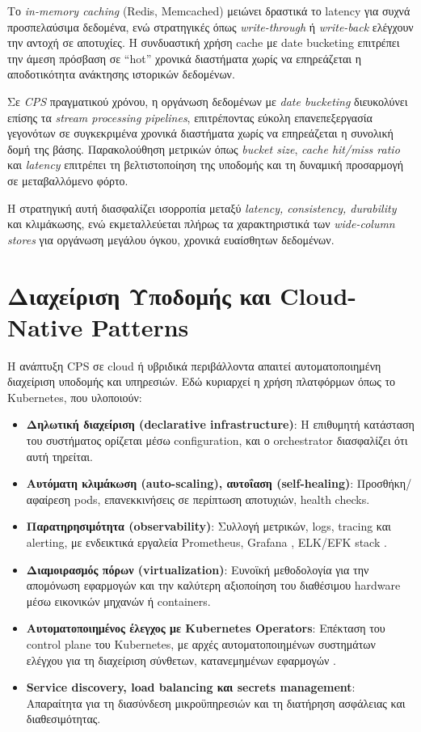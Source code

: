 Το \textit{in-memory caching} (Redis, Memcached) μειώνει δραστικά το latency
για συχνά προσπελαύσιμα δεδομένα, ενώ στρατηγικές όπως \textit{write-through} ή
\textit{write-back} ελέγχουν την αντοχή σε αποτυχίες. Η συνδυαστική χρήση cache
με date bucketing επιτρέπει την άμεση πρόσβαση σε “hot” χρονικά διαστήματα
χωρίς να επηρεάζεται η αποδοτικότητα ανάκτησης ιστορικών δεδομένων.

Σε \textit{CPS} πραγματικού χρόνου, η οργάνωση δεδομένων με \textit{date
	bucketing} διευκολύνει επίσης τα \textit{stream processing pipelines},
επιτρέποντας εύκολη επανεπεξεργασία γεγονότων σε συγκεκριμένα χρονικά
διαστήματα χωρίς να επηρεάζεται η συνολική δομή της βάσης. Παρακολούθηση
μετρικών όπως \textit{bucket size}, \textit{cache hit/miss ratio} και
\textit{latency} επιτρέπει τη βελτιστοποίηση της υποδομής και τη δυναμική
προσαρμογή σε μεταβαλλόμενο φόρτο.

Η στρατηγική αυτή διασφαλίζει ισορροπία μεταξύ \textit{latency, consistency,
	durability} και κλιμάκωσης, ενώ εκμεταλλεύεται πλήρως τα χαρακτηριστικά των
\textit{wide-column stores} για οργάνωση μεγάλου όγκου, χρονικά ευαίσθητων
δεδομένων.

\section{Διαχείριση Υποδομής και Cloud-Native Patterns}

Η ανάπτυξη CPS σε cloud ή υβριδικά περιβάλλοντα απαιτεί αυτοματοποιημένη
διαχείριση υποδομής και υπηρεσιών. Εδώ κυριαρχεί η χρήση πλατφόρμων όπως το
Kubernetes, που υλοποιούν:

\begin{itemize}
	\item \textbf{Δηλωτική διαχείριση (declarative infrastructure)}: Η
	      επιθυμητή κατάσταση του συστήματος ορίζεται μέσω configuration,
	      και ο orchestrator διασφαλίζει ότι αυτή τηρείται.
	\item \textbf{Αυτόματη κλιμάκωση (auto-scaling), αυτοΐαση
		      (self-healing)}: Προσθήκη/αφαίρεση pods, επανεκκινήσεις σε
	      περίπτωση αποτυχιών, health checks.
	\item \textbf{Παρατηρησιμότητα (observability)}: Συλλογή μετρικών,
	      logs, tracing και alerting, με ενδεικτικά εργαλεία Prometheus,
	      Grafana \cite{pragathi_prometheus_grafana}, ELK/EFK stack
	      \cite{li_elk_bpm_2024}.
	\item \textbf{Διαμοιρασμός πόρων (virtualization)}: Ευνοϊκή μεθοδολογία
	      για την απομόνωση εφαρμογών και την καλύτερη αξιοποίηση του
	      διαθέσιμου hardware μέσω εικονικών μηχανών ή containers.
	\item \textbf{Αυτοματοποιημένος έλεγχος με Kubernetes Operators}:
	      Επέκταση του control plane του Kubernetes, με αρχές
	      αυτοματοποιημένων συστημάτων ελέγχου για τη διαχείριση
	      σύνθετων, κατανεμημένων εφαρμογών
	      \cite{coreos_operator_pattern}.
	\item \textbf{Service discovery, load balancing και secrets
		      management}: Απαραίτητα για τη διασύνδεση μικροϋπηρεσιών και τη
	      διατήρηση ασφάλειας και διαθεσιμότητας.
\end{itemize}

